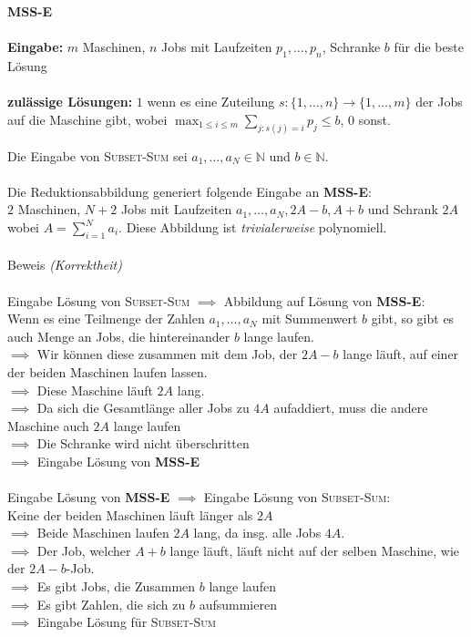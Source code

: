 
\begin{framed}
\textbf{MSS-E}\\ \ \\
\textbf{Eingabe:} $m$ Maschinen, $n$ Jobs mit Laufzeiten $p_1, \dots, p_n$, Schranke $b$ für die beste Lösung\\ \ \\
\textbf{zulässige Lösungen:} $1$ wenn es eine Zuteilung $s: \{1, \dots, n\} \to \{1, \dots, m\}$ der Jobs auf die Maschine gibt, wobei $\max_{1\leq i\leq m} \sum_{j:s(j)=i} p_j \leq b$, $0$ sonst.
\end{framed}

Die Eingabe von \textsc{Subset-Sum} sei $a_1, \dots, a_N \in \mathbb{N}$ und $b \in \mathbb{N}$.\\ \ \\
Die Reduktionsabbildung generiert folgende Eingabe an \textbf{MSS-E}:\\
$2$ Maschinen, $N + 2$ Jobs mit Laufzeiten $a_1, \dots, a_N, 2A - b, A + b$ und Schrank $2A$ wobei
$A=\sum_{i=1}^N a_i$. Diese Abbildung ist \textit{trivialerweise} polynomiell.\\ \ \\

Beweis \textit{(Korrektheit)} \\ \ \\
Eingabe Lösung von \textsc{Subset-Sum} $\implies$ Abbildung auf Lösung von \textbf{MSS-E}:\\
Wenn es eine Teilmenge der Zahlen $a_1, \dots, a_N$ mit Summenwert $b$ gibt, so gibt es auch Menge an Jobs, die hintereinander $b$ lange laufen.\\
$\implies$
Wir können diese zusammen mit dem Job, der $2A - b$ lange läuft, auf einer der beiden Maschinen laufen lassen.\\
$\implies$
Diese Maschine läuft $2A$ lang.\\
$\implies$ Da sich die Gesamtlänge aller Jobs zu $4A$ aufaddiert, muss die andere Maschine auch $2A$ lange laufen\\
$\implies$ Die Schranke wird nicht überschritten\\
$\implies$ Eingabe Lösung von \textbf{MSS-E}
\\ \ \\
Eingabe Lösung von \textbf{MSS-E} $\implies$ Eingabe Lösung von \textsc{Subset-Sum}:\\
Keine der beiden Maschinen läuft länger als $2A$\\
$\implies$ Beide Maschinen laufen $2A$ lang, da insg. alle Jobs $4A$.\\
$\implies$ Der Job, welcher $A + b$ lange läuft, läuft nicht auf der selben Maschine, wie der $2A - b$-Job.\\
$\implies$ Es gibt Jobs, die Zusammen $b$ lange laufen\\
$\implies$ Es gibt Zahlen, die sich zu $b$ aufsummieren\\
$\implies$ Eingabe Lösung für \textsc{Subset-Sum}